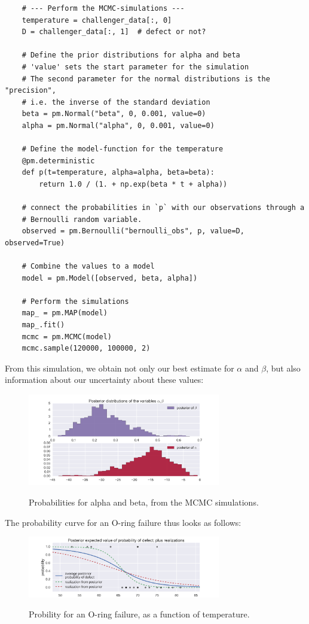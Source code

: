 \begin{lstlisting}
    # --- Perform the MCMC-simulations ---
    temperature = challenger_data[:, 0]
    D = challenger_data[:, 1]  # defect or not?

    # Define the prior distributions for alpha and beta
    # 'value' sets the start parameter for the simulation
    # The second parameter for the normal distributions is the "precision",
    # i.e. the inverse of the standard deviation
    beta = pm.Normal("beta", 0, 0.001, value=0)
    alpha = pm.Normal("alpha", 0, 0.001, value=0)

    # Define the model-function for the temperature
    @pm.deterministic
    def p(t=temperature, alpha=alpha, beta=beta):
        return 1.0 / (1. + np.exp(beta * t + alpha))

    # connect the probabilities in `p` with our observations through a
    # Bernoulli random variable.
    observed = pm.Bernoulli("bernoulli_obs", p, value=D, observed=True)

    # Combine the values to a model
    model = pm.Model([observed, beta, alpha])

    # Perform the simulations
    map_ = pm.MAP(model)
    map_.fit()
    mcmc = pm.MCMC(model)
    mcmc.sample(120000, 100000, 2)
\end{lstlisting}

From this simulation, we obtain not only our best estimate for $\alpha$ and $\beta$, but also information about our uncertainty about these values:

\begin{figure}[H]
  \centering
  \includegraphics[width=0.75\textwidth]{../Images/Challenger_Parameters.png}\\
  \caption{Probabilities for alpha and beta, from the MCMC simulations.}
\end{figure}

The probability curve for an O-ring failure thus looks as follows:

\begin{figure}[H]
  \centering
  \includegraphics[width=0.75\textwidth]{../Images/Challenger_Probability.png}\\
  \caption{Probility for an O-ring failure, as a function of temperature.}
\end{figure}

